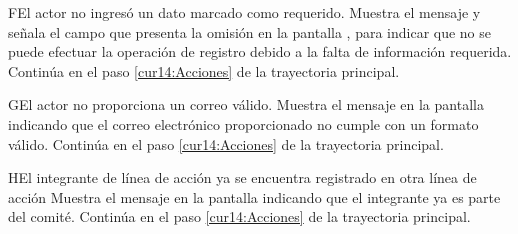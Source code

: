  \begin{UCtrayectoriaA}{F}{El actor no ingresó un dato marcado como requerido.}
    \UCpaso[\UCsist] Muestra el mensaje  y señala el campo que presenta la omisión en la pantalla , para indicar que
    no se puede efectuar la operación de registro debido a la falta de información requerida.
   \UCpaso[] Continúa en el paso \ref{cur14:Acciones} de la trayectoria principal.
 \end{UCtrayectoriaA}
 
 \begin{UCtrayectoriaA}{G}{El actor no proporciona un correo válido.}
    \UCpaso[\UCsist] Muestra el mensaje  en la pantalla  indicando que el correo electrónico proporcionado no cumple con un formato válido.
    \UCpaso Continúa en el paso \ref{cur14:Acciones} de la trayectoria principal.
 \end{UCtrayectoriaA}
 
  \begin{UCtrayectoriaA}{H}{El integrante de línea de acción ya se encuentra registrado en otra línea de acción}
    \UCpaso[\UCsist] Muestra el mensaje  en la pantalla  indicando que el integrante ya es parte del comité. 
    \UCpaso Continúa en el paso \ref{cur14:Acciones} de la trayectoria principal.
 \end{UCtrayectoriaA}
